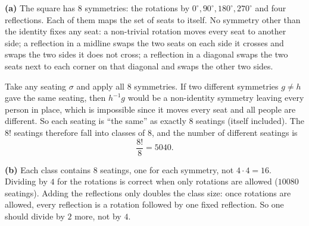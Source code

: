 \textbf{(a)} The square has $8$ symmetries: the rotations by $0^\circ,90^\circ,180^\circ,270^\circ$ and four reflections. Each of them maps the set of seats to itself. No symmetry other than the identity fixes any seat: a non-trivial rotation moves every seat to another side; a reflection in a midline swaps the two seats on each side it crosses and swaps the two sides it does not cross; a reflection in a diagonal swaps the two seats next to each corner on that diagonal and swaps the other two sides.

Take any seating $\sigma$ and apply all $8$ symmetries. If two different symmetries $g\ne h$ gave the same seating, then $h^{-1}g$ would be a non-identity symmetry leaving every person in place, which is impossible since it moves every seat and all people are different. So each seating is ``the same'' as exactly $8$ seatings (itself included). The $8!$ seatings therefore fall into classes of $8$, and the number of different seatings is
\[\dfrac{8!}{8}=\boxed{5040}.\]

\textbf{(b)} Each class contains $8$ seatings, one for each symmetry, not $4\cdot4=16$. Dividing by $4$ for the rotations is correct when only rotations are allowed ($10080$ seatings). Adding the reflections only doubles the class size: once rotations are allowed, every reflection is a rotation followed by one fixed reflection. So one should divide by $2$ more, not by $4$.
